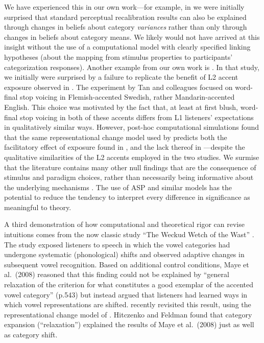 \documentclass[
  11pt,
  man,floatsintext]{apa6}
\begin{document}
We have experienced this in our own work---for example, in \textcite{kleinschmidt-jaeger2015} we were initially surprised that standard perceptual recalibration results can also be explained through changes in beliefs about category \emph{variances} rather than only through changes in beliefs about category means. We likely would not have arrived at this insight without the use of a computational model with clearly specified linking hypotheses (about the mapping from stimulus properties to participants' categorization responses). Another example from our own work is \textcite{tan2021}. In that study, we initially were surprised by a failure to replicate the benefit of L2 accent exposure observed in \textcite{xie2016jep}. The experiment by Tan and colleagues focused on word-final stop voicing in Flemish-accented Swedish, rather Mandarin-accented English. This choice was motivated by the fact that, at least at first blush, word-final stop voicing in both of these accents differs from L1 listeners' expectations in qualitatively similar ways. However, post-hoc computational simulations found that the same representational change model used by \textcite{kleinschmidt-jaeger2015} predicts both the facilitatory effect of exposure found in \textcite{xie2016jep}, and the lack thereof in \textcite{tan2021} ---despite the qualitative similarities of the L2 accents employed in the two studies. We surmise that the literature contains many other null findings that are the consequence of stimulus and paradigm choices, rather than necessarily being informative about the underlying mechanisms \autocites[see e.g.,][]{floccia2006,zheng-samuel2020}. The use of ASP and similar models has the potential to reduce the tendency to interpret every difference in significance as meaningful to theory.

A third demonstration of how computational and theoretical rigor can revise intuitions comes from the now classic study ``The Weckud Wetch of the Wast'' \autocite{maye2008}. The study exposed listeners to speech in which the vowel categories had undergone systematic (phonological) shifts and observed adaptive changes in subsequent vowel recognition. Based on additional control conditions, Maye et al.~(2008) reasoned that this finding could not be explained by ``general relaxation of the criterion for what constitutes a good exemplar of the accented vowel category'' (p.543) but instead argued that listeners had learned ways in which vowel representations are shifted. \textcite{hitczenko-feldman2016} recently revisited this result, using the representational change model of \textcite{kleinschmidt-jaeger2015}. Hitczenko and Feldman found that category expansion (``relaxation'') explained the results of Maye et al.~(2008) just as well as category shift.
\end{document}
